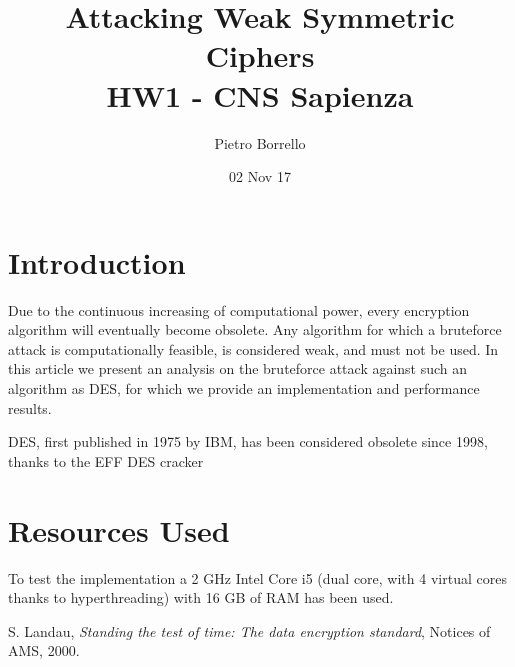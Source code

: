 \documentclass[11pt]{article}
\title{Attacking Weak Symmetric Ciphers \\ \bigskip \large HW1 - CNS Sapienza}
\author{Pietro Borrello}
\date{02 Nov 17}
\begin{document}
  \maketitle

  \section{Introduction}
  Due to the continuous increasing of computational power, every encryption algorithm will eventually become obsolete.
  Any algorithm for which a bruteforce attack is computationally feasible, is considered weak, and must not be used. In this article we present an analysis on the bruteforce attack against such an algorithm as DES, for which we provide an implementation and performance results.

  DES, first published in 1975 by IBM, has been considered obsolete since 1998, thanks to the EFF DES cracker \cite{descracker}

  \section{Resources Used}
  To test the implementation a 2 GHz Intel Core i5 (dual core, with 4 virtual cores thanks to hyperthreading) with 16 GB of RAM has been used.


  \begin{thebibliography}{99}

      S. Landau,
      \textit{Standing the test of time: The data encryption standard},
      Notices of AMS,
      2000.

  \end{thebibliography}
\end{document}

